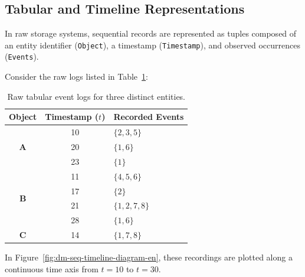 \subsection{Tabular and Timeline Representations}
In raw storage systems, sequential records are represented as tuples composed of an entity identifier (\texttt{Object}), a timestamp (\texttt{Timestamp}), and observed occurrences (\texttt{Events}).

Consider the raw logs listed in Table~\ref{tab:dm-seq-raw-table-en}:
\begin{table}[htbp]
\centering
\small
\renewcommand{\arraystretch}{1.2}
\begin{tabular}{c c l}
\toprule
\textbf{Object} & \textbf{Timestamp ($t$)} & \textbf{Recorded Events} \\
\midrule
\multirow{3}{*}{\textbf{A}} & 10 & $\{2, 3, 5\}$ \\
                            & 20 & $\{1, 6\}$ \\
                            & 23 & $\{1\}$ \\
\midrule
\multirow{4}{*}{\textbf{B}} & 11 & $\{4, 5, 6\}$ \\
                            & 17 & $\{2\}$ \\
                            & 21 & $\{1, 2, 7, 8\}$ \\
                            & 28 & $\{1, 6\}$ \\
\midrule
\textbf{C}                  & 14 & $\{1, 7, 8\}$ \\
\bottomrule
\end{tabular}
\caption{Raw tabular event logs for three distinct entities.}
\label{tab:dm-seq-raw-table-en}
\end{table}

In Figure~\ref{fig:dm-seq-timeline-diagram-en}, these recordings are plotted along a continuous time axis from $t = 10$ to $t = 30$.

